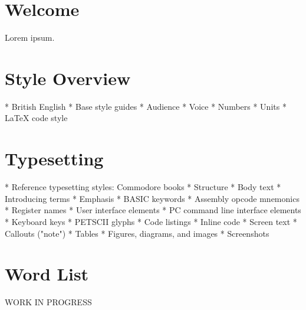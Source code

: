 


\chapter{Welcome}

Lorem ipsum.


\chapter{Style Overview}

* British English
* Base style guides
* Audience
* Voice
* Numbers
* Units
* LaTeX code style


\chapter{Typesetting}

* Reference typesetting styles: Commodore books
* Structure
* Body text
* Introducing terms
* Emphasis
* BASIC keywords
* Assembly opcode mnemonics
* Register names
* User interface elements
* PC command line interface elements
* Keyboard keys
* PETSCII glyphs
* Code listings
* Inline code
* Screen text
* Callouts ("note")
* Tables
* Figures, diagrams, and images
* Screenshots


\chapter{Word List}

WORK IN PROGRESS



